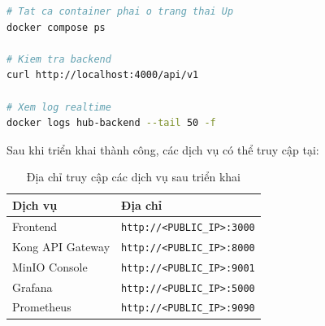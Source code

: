 \begin{lstlisting}[language=bash]
# Tat ca container phai o trang thai Up
docker compose ps

# Kiem tra backend
curl http://localhost:4000/api/v1

# Xem log realtime
docker logs hub-backend --tail 50 -f
\end{lstlisting}

Sau khi triển khai thành công, các dịch vụ có thể truy cập tại:

\begin{table}[H]
\centering
\caption{Địa chỉ truy cập các dịch vụ sau triển khai}
\label{tab:service-urls}
\renewcommand{\arraystretch}{1.4}
\begin{tabular}{|l|l|}
\hline
\textbf{Dịch vụ} & \textbf{Địa chỉ} \\
\hline
Frontend & \texttt{http://<PUBLIC\_IP>:3000} \\
\hline
Kong API Gateway & \texttt{http://<PUBLIC\_IP>:8000} \\
\hline
MinIO Console & \texttt{http://<PUBLIC\_IP>:9001} \\
\hline
Grafana & \texttt{http://<PUBLIC\_IP>:5000} \\
\hline
Prometheus & \texttt{http://<PUBLIC\_IP>:9090} \\
\hline
\end{tabular}
\end{table}
